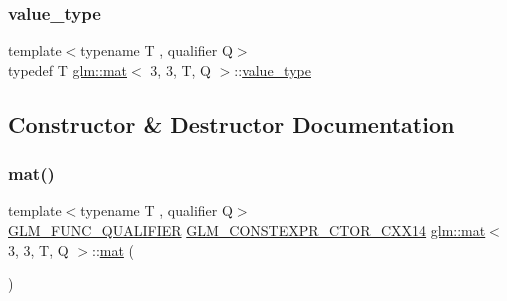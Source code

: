 \mbox{\label{structglm_1_1mat_3_013_00_013_00_01_t_00_01_q_01_4_a1fba85531bcdc9309f4755f30f44dd6f}} 
\subsubsection{\texorpdfstring{value\+\_\+type}{value\_type}}
{\footnotesize\ttfamily template$<$typename T , qualifier Q$>$ \\
typedef T \mbox{\hyperlink{structglm_1_1mat}{glm\+::mat}}$<$ 3, 3, T, Q $>$\+::\mbox{\hyperlink{structglm_1_1mat_3_013_00_013_00_01_t_00_01_q_01_4_a1fba85531bcdc9309f4755f30f44dd6f}{value\+\_\+type}}}



\subsection{Constructor \& Destructor Documentation}
\mbox{\label{structglm_1_1mat_3_013_00_013_00_01_t_00_01_q_01_4_ab10ee3449d1ee8d793fed6b94fe6270d}} 
\subsubsection{\texorpdfstring{mat()}{mat()}\hspace{0.1cm}{\footnotesize\ttfamily [1/21]}}
{\footnotesize\ttfamily template$<$typename T , qualifier Q$>$ \\
\mbox{\hyperlink{setup_8hpp_a33fdea6f91c5f834105f7415e2a64407}{G\+L\+M\+\_\+\+F\+U\+N\+C\+\_\+\+Q\+U\+A\+L\+I\+F\+I\+ER}} \mbox{\hyperlink{setup_8hpp_a0900f9145e68bf6061b6f5e7be3fa751}{G\+L\+M\+\_\+\+C\+O\+N\+S\+T\+E\+X\+P\+R\+\_\+\+C\+T\+O\+R\+\_\+\+C\+X\+X14}} \mbox{\hyperlink{structglm_1_1mat}{glm\+::mat}}$<$ 3, 3, T, Q $>$\+::\mbox{\hyperlink{structglm_1_1mat}{mat}} (\begin{DoxyParamCaption}{ }\end{DoxyParamCaption})}

\mbox{\label{structglm_1_1mat_3_013_00_013_00_01_t_00_01_q_01_4_a15f1bac6c533d3d97a2caefbbe13f4c1}} 
